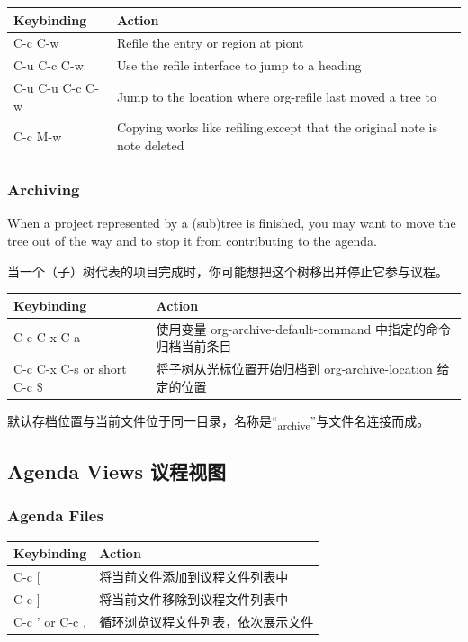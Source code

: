 \documentclass[11pt]{article}
\begin{document}
\begin{center}
\begin{tabular}{ll}
Keybinding & Action\\[0pt]
\hline
C-c C-w & Refile the entry or region at piont\\[0pt]
C-u C-c C-w & Use the refile interface to jump to a heading\\[0pt]
C-u C-u C-c C-w & Jump to the location where org-refile last moved a tree to\\[0pt]
C-c M-w & Copying works like refiling,except that the original note is note deleted\\[0pt]
\end{tabular}
\end{center}

\subsubsection{Archiving}
\label{sec:org6ea6cbf}
When a project represented by a (sub)tree is finished, you may want to move the tree out of the way and to stop it from contributing to the agenda.

当一个（子）树代表的项目完成时，你可能想把这个树移出并停止它参与议程。

\begin{center}
\begin{tabular}{ll}
Keybinding & Action\\[0pt]
\hline
C-c C-x C-a & 使用变量 org-archive-default-command 中指定的命令归档当前条目\\[0pt]
C-c C-x C-s or short C-c \$ & 将子树从光标位置开始归档到 org-archive-location 给定的位置\\[0pt]
\end{tabular}
\end{center}

默认存档位置与当前文件位于同一目录，名称是``\textsubscript{archive}''与文件名连接而成。

\subsection{Agenda Views 议程视图}
\label{sec:orgf5fd282}

\subsubsection{Agenda Files}
\label{sec:orgbc821fe}
\begin{center}
\begin{tabular}{ll}
Keybinding & Action\\[0pt]
\hline
C-c [ & 将当前文件添加到议程文件列表中\\[0pt]
C-c ] & 将当前文件移除到议程文件列表中\\[0pt]
C-c ' or C-c , & 循环浏览议程文件列表，依次展示文件\\[0pt]
\end{tabular}
\end{center}
\end{document}
